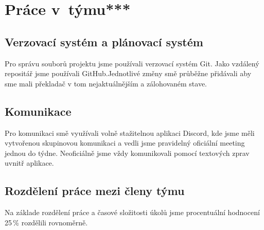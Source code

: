 \documentclass[a4paper, 11pt]{article}
\begin{document}
	\section{Práce v~týmu***}

	\subsection{Verzovací systém a plánovací systém}

	Pro správu souborů projektu jsme používali verzovací systém Git. Jako vzdálený repositář jsme používali \mbox{GitHub}.Jednotlivé změny smě průběžne přidávali aby sme mali překladač v tom nejaktuálnějším a zálohovaném stave.

	\subsection{Komunikace}

	Pro komunikaci smě využívali volně stažitelnou aplikaci Discord, kde jsme měli vytvořenou skupinovou komunikaci a vedli jsme pravidelný oficiální meeting jednou do týdne. Neoficiálně jsme vždy komunikovali pomocí textových zprav uvnitř aplikace.

	\subsection{Rozdělení práce mezi členy týmu}

	Na základe rozdělení práce a časové složitosti úkolů jsme procentuální hodnocení 25\,\% rozdělili rovnoměrně. 
	\bigskip
	
\end{document}
